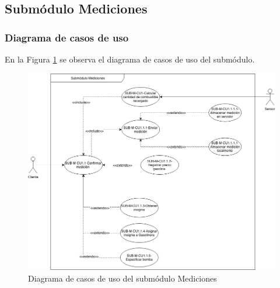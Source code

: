 \subsection{Submódulo Mediciones}
\subsubsection{Diagrama de casos de uso}
En la Figura \ref{fig:dcu-mediciones} se observa el diagrama de casos de uso del submódulo.
\begin{figure}[H]
	\centering
	\includegraphics[scale=.5]{Capitulo4/software/submodulos/mediciones/images/dcu}
	\caption{Diagrama de casos de uso del submódulo Mediciones}
	\label{fig:dcu-mediciones}
\end{figure}
\newpage








